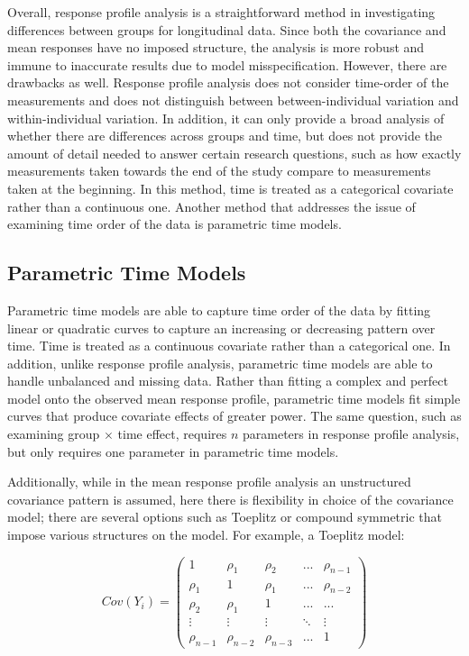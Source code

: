 \documentclass[12pt, twoside]{amherstthesis}
\begin{document}
Overall, response profile analysis is a straightforward method in investigating differences between groups for longitudinal data. Since both the covariance and mean responses have no imposed structure, the analysis is more robust and immune to inaccurate results due to model misspecification. However, there are drawbacks as well. Response profile analysis does not consider time-order of the measurements and does not distinguish between between-individual variation and within-individual variation. In addition, it can only provide a broad analysis of whether there are differences across groups and time, but does not provide the amount of detail needed to answer certain research questions, such as how exactly measurements taken towards the end of the study compare to measurements taken at the beginning. In this method, time is treated as a categorical covariate rather than a continuous one. Another method that addresses the issue of examining time order of the data is parametric time models.

\hypertarget{parametric-time-models}{%
\subsection{Parametric Time Models}\label{parametric-time-models}}

Parametric time models are able to capture time order of the data by fitting linear or quadratic curves to capture an increasing or decreasing pattern over time. Time is treated as a continuous covariate rather than a categorical one. In addition, unlike response profile analysis, parametric time models are able to handle unbalanced and missing data. Rather than fitting a complex and perfect model onto the observed mean response profile, parametric time models fit simple curves that produce covariate effects of greater power. The same question, such as examining group \(\times\) time effect, requires \(n\) parameters in response profile analysis, but only requires one parameter in parametric time models.

Additionally, while in the mean response profile analysis an unstructured covariance pattern is assumed, here there is flexibility in choice of the covariance model; there are several options such as Toeplitz or compound symmetric that impose various structures on the model. For example, a Toeplitz model:

\[Cov (Y_i) = \begin{pmatrix} 1 & \rho_1 & \rho_2 & ... & \rho_{n-1} \\ \rho_1 & 1 & \rho_1 & ... & \rho_{n-2} \\ \rho_2 & \rho_1 & 1 & ...& ... \\ \vdots & \vdots & \vdots & \ddots & \vdots \\ \rho_{n-1} & \rho_{n-2} & \rho_{n-3} & ... & 1  \end{pmatrix}\]
\end{document}
